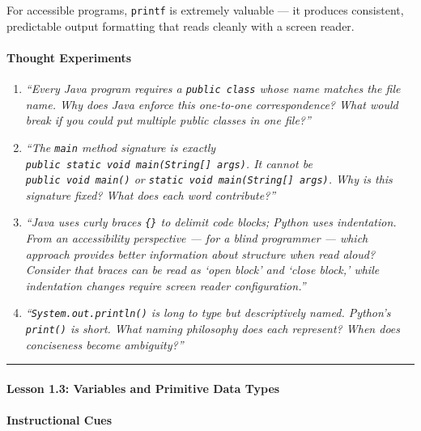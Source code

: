 \documentclass[
  justified,
  openright,
]{tufte-book}
\let\subsection\paragraph
\let\paragraph\paragraph
\let\subsection\paragraph
\let\paragraph\paragraph
\begin{document}
For accessible programs, \texttt{printf} is extremely valuable --- it
produces consistent, predictable output formatting that reads cleanly
with a screen reader.

\paragraph{Thought Experiments}\label{thought-experiments-31}

\begin{enumerate}
\def\labelenumi{\arabic{enumi}.}
\item
  \emph{``Every Java program requires a \texttt{public\ class} whose
  name matches the file name. Why does Java enforce this one-to-one
  correspondence? What would break if you could put multiple public
  classes in one file?''}
\item
  \emph{``The \texttt{main} method signature is exactly
  \texttt{public\ static\ void\ main(String{[}{]}\ args)}. It cannot be
  \texttt{public\ void\ main()} or
  \texttt{static\ void\ main(String{[}{]}\ args)}. Why is this signature
  fixed? What does each word contribute?''}
\item
  \emph{``Java uses curly braces \texttt{\{\}} to delimit code blocks;
  Python uses indentation. From an accessibility perspective --- for a
  blind programmer --- which approach provides better information about
  structure when read aloud? Consider that braces can be read as `open
  block' and `close block,' while indentation changes require screen
  reader configuration.''}
\item
  \emph{``\texttt{System.out.println()} is long to type but
  descriptively named. Python's \texttt{print()} is short. What naming
  philosophy does each represent? When does conciseness become
  ambiguity?''}
\end{enumerate}

\begin{center}\rule{0.5\linewidth}{0.5pt}\end{center}

\subsection{Lesson 1.3: Variables and Primitive Data
Types}\label{lesson-1.3-variables-and-primitive-data-types}

\paragraph{Instructional Cues}\label{instructional-cues-23}
\end{document}
